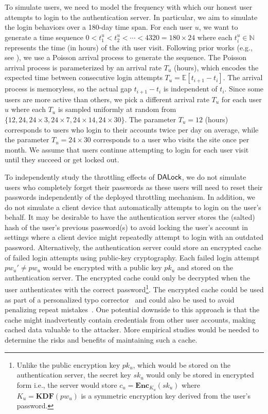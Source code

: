 To simulate users, we need to model the frequency with which our honest user attempts to login to the authentication server. In particular, we aim to simulate the login behaviors over a 180-day time span. For each user $u$, we want to generate a time sequence $0 < t_1^u < t_2^u < \cdots < 4320 = 180\times24$ where each $t_i^u \in \mathbb{N}$ represents the time (in hours) of the $i$th user visit. Following prior works (e.g., see \cite{AC:BloBluDat13,CCS:KogManBon17}), we use a Poisson arrival process to generate the sequence. The Poisson arrival process is parameterized by an arrival rate $T_u$ (hours), which encodes the expected time between consecutive login attempts $T_u = \mathbb{E}[t_{i+1}-t_i]$. The arrival process is memoryless, so the actual gap $t_{i+1}-t_i$  is independent of $t_i$. Since some users are more active than others, we pick a different arrival rate $T_u$ for each user $u$ where each $T_u$ is sampled uniformly at random from $\{ 12, 24, 24 \times 3, 24 \times 7, 24 \times 14, 24 \times 30\}$. The parameter $T_u = 12$ (hours) corresponds to users who login to their accounts twice per day on average, while the parameter $T_u = 24 \times 30$ corresponds to a user who visits the site once per month. We assume that users continue attempting to login for each user visit until they succeed or get locked out. 







To independently study the throttling effects of $\mathsf{DALock}$, we do not simulate users who completely forget their passwords as these users will need to reset their passwords independently of the deployed throttling mechanism. In addition, we do not simulate a client device that automatically attempts to login on the user's behalf. It may be desirable to have the authentication server stores the (salted) hash of the user’s previous password(s) to avoid locking the user's account in settings where a client device might repeatedly attempt to login with an outdated password. Alternatively, the authentication server could store an encrypted cache of failed login attempts using public-key cryptography. Each failed login attempt $pw_u' \neq pw_u$ would be encrypted with a public key $pk_u$ and stored on the authentication server. The encrypted cache could only be decrypted when the user authenticates with the correct password\footnote{Unlike the public encryption key $pk_u$, which would be stored on the authentication server, the secret key $sk_u$ would only be stored in encrypted form i.e., the server would store $c_u = \mathbf{Enc}_{K_u}(sk_u)$ where $K_u = \mathbf{KDF}(pw_u)$ is a symmetric encryption key derived from the user's password. }. The encrypted cache could be used as part of a personalized typo corrector~\cite{CCS:CWPCR17} and could also be used to avoid penalizing repeat mistakes~\cite{CCS:CWPCR17,EuroSP:THS19}. One potential downside to this approach is that the cache might inadvertently contain credentials from other user accounts, making cached data valuable to the attacker. More empirical studies would be needed to determine the risks and benefits of maintaining such a cache.



